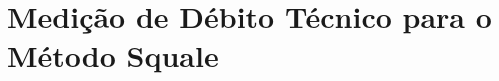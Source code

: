 \chapter[Medição de Débito Técnico para o Método Squale]{Medição de Débito Técnico para o Método Squale}
